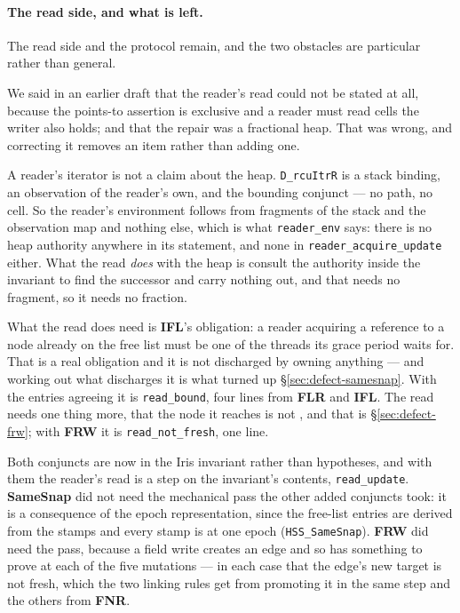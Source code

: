 \paragraph{The read side, and what is left.}
\label{sec:inv-readside}
The read side and the protocol remain, and the two obstacles are particular
rather than general.

We said in an earlier draft that the reader's read could not be stated at all,
because the points-to assertion is exclusive and a reader must read cells the
writer also holds; and that the repair was a fractional heap.  That was wrong,
and correcting it removes an item rather than adding one.

A reader's iterator is not a claim about the heap.  \texttt{D\_rcuItrR} is a
stack binding, an \itr{} observation of the reader's own, and the bounding
conjunct --- no path, no cell.  So the reader's environment follows from
fragments of the stack and the observation map and nothing else, which is what
\texttt{reader\_env} says: there is no heap authority anywhere in its statement,
and none in \texttt{reader\_acquire\_update} either.  What the read \emph{does}
with the heap is consult the authority inside the invariant to find the
successor and carry nothing out, and that needs no fragment, so it needs no
fraction.

What the read does need is \textbf{IFL}'s obligation: a reader acquiring a
reference to a node already on the free list must be one of the threads its
grace period waits for.  That is a real obligation and it is not discharged by
owning anything --- and working out what discharges it is what turned up
\S\ref{sec:defect-samesnap}.  With the entries agreeing it is
\texttt{read\_bound}, four lines from \textbf{FLR} and \textbf{IFL}.  The read
needs one thing more, that the node it reaches is not \frsh{}, and that is
\S\ref{sec:defect-frw}; with \textbf{FRW} it is \texttt{read\_not\_fresh}, one
line.

Both conjuncts are now in the Iris invariant rather than hypotheses, and with
them the reader's read is a step on the invariant's contents,
\texttt{read\_update}.  \textbf{SameSnap} did not need the mechanical pass the
other added conjuncts took: it is a consequence of the epoch representation,
since the free-list entries are derived from the stamps and every stamp is at
one epoch (\texttt{HSS\_SameSnap}).  \textbf{FRW} did need the pass, because a
field write creates an edge and so has something to prove at each of the five
mutations --- in each case that the edge's new target is not fresh, which the
two linking rules get from promoting it in the same step and the others from
\textbf{FNR}.

